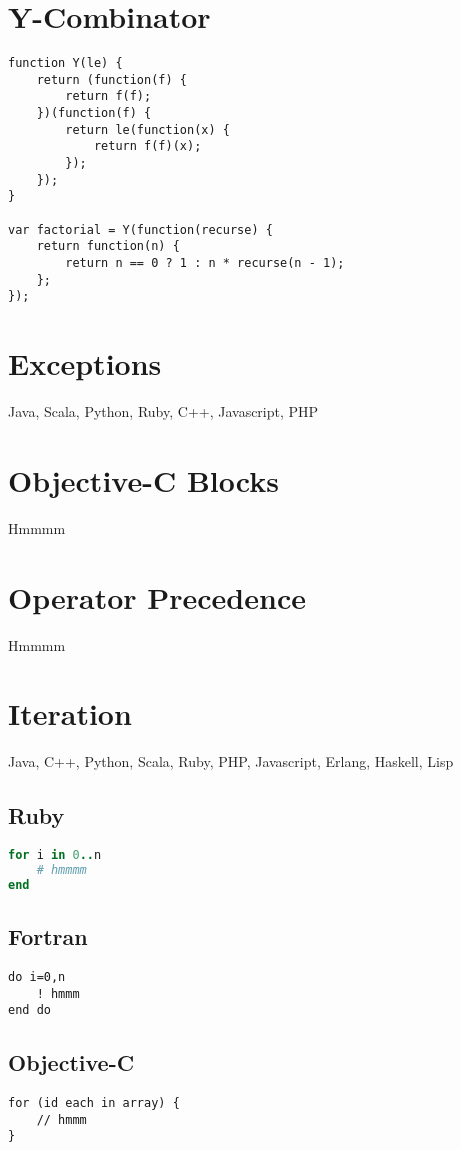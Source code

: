 \documentclass{article}
\begin{document}
\section{Y-Combinator}
\begin{lstlisting}
function Y(le) {
    return (function(f) {
        return f(f);
    })(function(f) {
        return le(function(x) {
            return f(f)(x);
        });
    });
}

var factorial = Y(function(recurse) {
    return function(n) {
        return n == 0 ? 1 : n * recurse(n - 1);
    };
});
\end{lstlisting}

\section{Exceptions}
Java, Scala, Python, Ruby, C++, Javascript, PHP

\section{Objective-C Blocks}
Hmmmm

\section{Operator Precedence}
Hmmmm

\section{Iteration}
Java, C++, Python, Scala, Ruby, PHP, Javascript, Erlang, Haskell, Lisp
\subsection{Ruby}
\begin{lstlisting}[language=Ruby]
for i in 0..n
	# hmmmm
end
\end{lstlisting}
\subsection{Fortran}
\begin{lstlisting}
do i=0,n
	! hmmm
end do
\end{lstlisting}
\subsection{Objective-C}
\begin{lstlisting}
for (id each in array) {
	// hmmm
}
\end{lstlisting}
\end{document}
